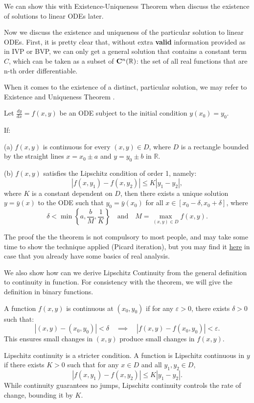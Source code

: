 \documentclass[12pt,a4paper]{article}
\begin{document}
\begin{solution}
\begin{remark}
We can show this with Existence-Uniqueness Theorem when discuss the existence of solutions to linear ODEs later.

Now we discuss the existence and uniqueness of the particular solution to linear ODEs. First, it is pretty clear that, without extra \textbf{valid} information provided as in IVP or BVP, we can only get a general solution that contains a constant term $C$, which can be taken as a subset of $\mathbf{C}^n(\mathbb{R})$: the set of all real functions that are n-th order differentiable.

When it comes to the existence of a distinct, particular solution, we may refer to Existence and Uniqueness Theorem \parencite{dey_differential_2021}.

\begin{theorem}
Let $\frac{dy}{dx} = f(x, y)$
be an ODE subject to the initial condition \( y(x_0) = y_0 \).

If:

(a) \( f(x, y) \) is continuous for every \( (x, y) \in D \), where \( D \) is a rectangle bounded by the straight lines \( x = x_0 \pm a \) and \( y = y_0 \pm b \) in \( \mathbb{R} \).

(b) \( f(x, y) \) satisfies the Lipschitz condition of order 1, namely:
\[
|f(x, y_1) - f(x, y_2)| \leq K |y_1 - y_2|,
\]
where \( K \) is a constant dependent on \( D \), then there exists a unique solution \( y = \bar{y}(x) \) to the ODE such that \( y_0 = \bar{y}(x_0) \) for all \( x \in [x_0 - \delta, x_0 + \delta] \), where
\[
\delta < \min \left\{ a, \frac{b}{M}, \frac{1}{K} \right\} \quad \text{and} \quad M = \max_{(x, y) \in D} f(x, y).
\]
\end{theorem}
\begin{note}
    The proof the the theorem is not compulsory to most people, and may take some time to show the technique applied (Picard iteration), but you may find it \href{https://en.wikipedia.org/wiki/Picard%E2%80%93Lindel%C3%B6f_theorem}{here} in case that you already have some basics of real analysis.
\end{note}
     We also show how can we derive Lipschitz Continuity from the general definition to continuity in function. For consistency with the theorem, we will give the definition in binary functions.
\begin{definition}[Continuity]
    A function \( f(x, y) \) is continuous at \( (x_0, y_0) \) if for any \( \varepsilon > 0 \), there exists \( \delta > 0 \) such that:
\[
|(x, y) - (x_0, y_0)| < \delta \quad \implies \quad |f(x, y) - f(x_0, y_0)| < \varepsilon.
\]
This ensures small changes in \( (x, y) \) produce small changes in \( f(x, y) \).
\end{definition}
Lipschitz continuity is a stricter condition. A function is Lipschitz continuous in \( y \) if there exists \( K > 0 \) such that for any \( x \in D \) and all \( y_1, y_2 \in D \),
\[
|f(x, y_1) - f(x, y_2)| \leq K |y_1 - y_2|.
\]
While continuity guarantees no jumps, Lipschitz continuity controls the rate of change, bounding it by \( K \).


\end{remark}
\end{solution}
\end{document}
